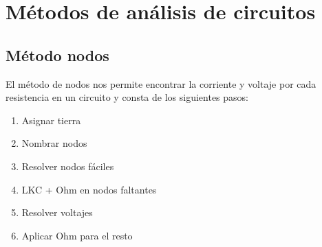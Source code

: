 





\section{Métodos de análisis de circuitos}

\subsection{Método nodos}
\justify
El método de nodos nos permite encontrar la corriente y voltaje por cada resistencia en un circuito y consta de los siguientes pasos:
\begin{enumerate}
    \item Asignar tierra
    \item Nombrar nodos
    \item Resolver nodos fáciles 
    \item LKC + Ohm en nodos faltantes
    \item Resolver voltajes
	\item Aplicar Ohm para el resto
\end{enumerate}


